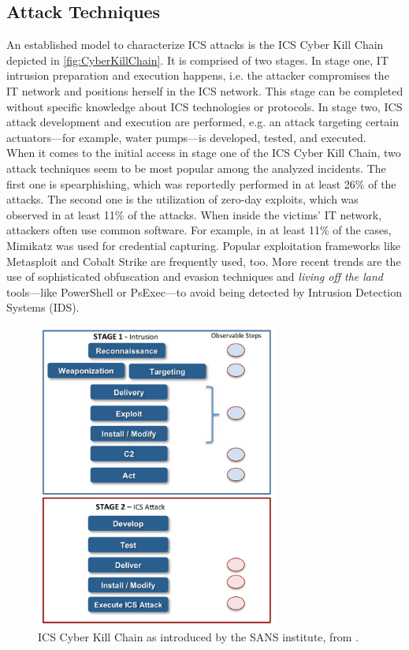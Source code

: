 \documentclass[runningheads]{llncs}
\begin{document}
\subsection{Attack Techniques}
\label{subsection:overview-techniques}
An established model to characterize ICS attacks is the ICS Cyber Kill Chain depicted in \autoref{fig:CyberKillChain}.
It is comprised of two stages.
In stage one, IT intrusion preparation and execution happens, i.e. the attacker compromises the IT network and positions herself in the ICS network.
This stage can be completed without specific knowledge about ICS technologies or protocols.
In stage two, ICS attack development and execution are performed, e.g. an attack targeting certain actuators---for example, water pumps---is developed, tested, and executed.\\
When it comes to the initial access in stage one of the ICS Cyber Kill Chain, two attack techniques seem to be most popular among the analyzed incidents.
The first one is spearphishing, which was reportedly performed in at least 26\% of the attacks.
The second one is the utilization of zero-day exploits, which was observed in at least 11\% of the attacks.
When inside the victims' IT network, attackers often use common software.
For example, in at least 11\% of the cases, Mimikatz was used for credential capturing.
Popular exploitation frameworks like Metasploit and Cobalt Strike are frequently used, too.
More recent trends are the use of sophisticated obfuscation and evasion techniques and \textit{living off the land} tools---like PowerShell or PsExec---to avoid being detected by Intrusion Detection Systems (IDS).
\begin{figure}[H]
    \centering
    \includegraphics[width=8cm]{figures/ICSCyberKillChain.png}
    \caption{ICS Cyber Kill Chain as introduced by the SANS institute, from \cite{assante.15}.}
    \label{fig:CyberKillChain}
\end{figure}\noindent
\end{document}
